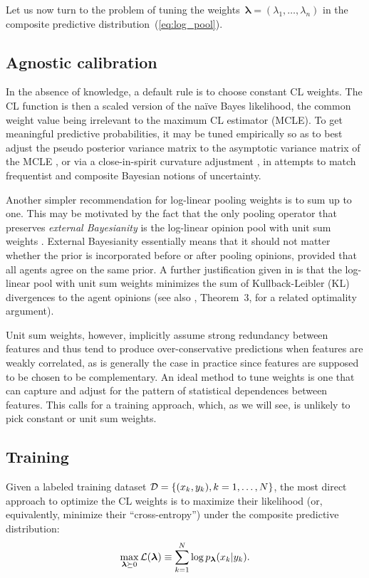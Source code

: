 \documentclass[english]{scrartcl}
\newcommand{\lda}{{\boldsymbol{\lambda}}}
\begin{document}
Let us now turn to the problem of tuning the weights~$\lda=(\lambda_1,\ldots,\lambda_n)$ in the composite predictive distribution~(\ref{eq:log_pool}).

\subsection{Agnostic calibration}

In the absence of knowledge, a default rule is to choose constant CL weights. The CL function is then a scaled version of the na\"ive Bayes likelihood, the common weight value being irrelevant to the maximum CL estimator (MCLE). To get meaningful predictive probabilities, it may be tuned empirically so as to best adjust the pseudo posterior variance matrix to the asymptotic variance matrix of the MCLE \cite{Pauli-11}, or via a close-in-spirit curvature adjustment \cite{Ribatet-12}, in attempts to match frequentist and composite Bayesian notions of uncertainty.

Another simpler recommendation for log-linear pooling weights is to sum up to one. This may be motivated by the fact that the only pooling operator that preserves {\em external Bayesianity} is the log-linear opinion pool with unit sum weights \cite{Genest-86b}. External Bayesianity essentially means that it should not matter whether the prior is incorporated before or after pooling opinions, provided that all agents agree on the same prior. A further justification given in \cite{Garg-04} is that the log-linear pool with unit sum weights minimizes the sum of Kullback-Leibler (KL) divergences to the agent opinions (see also \cite{Wang-14}, Theorem~3, for a related optimality argument).

Unit sum weights, however, implicitly assume strong redundancy between features and thus tend to produce over-conservative predictions when features are weakly correlated, as is generally the case in practice since features are supposed to be chosen to be complementary. An ideal method to tune weights is one that can capture and adjust for the pattern of statistical dependences between features. This calls for a training approach, which, as we will see, is unlikely to pick constant or unit sum weights.


\subsection{Training}

Given a labeled training dataset ${\cal D}=\{(x_k, y_k), k=1,\ldots,N\}$, the most direct approach to optimize the CL weights is to maximize their likelihood (or, equivalently, minimize their ``cross-entropy'')  under the composite predictive distribution:
$$
\max_{\lda\succeq 0} {\cal L}(\lda)
\equiv\sum_{k=1}^N \log p_\lda(x_k|y_k).
$$
\end{document}
